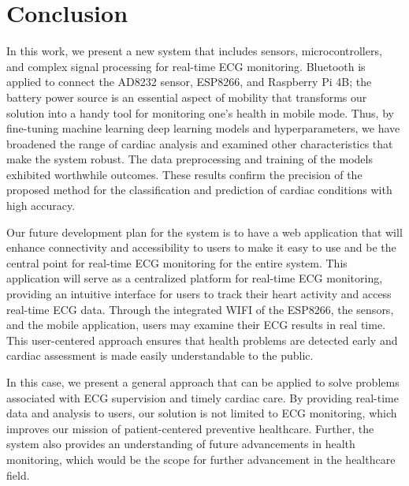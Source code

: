 \documentclass[conference]{IEEEtran}
\begin{document}
\section{Conclusion}

In this work, we present a new system that includes sensors, microcontrollers, and complex signal processing for real-time ECG monitoring. Bluetooth is applied to connect the AD8232 sensor, ESP8266, and Raspberry Pi 4B; the battery power source is an essential aspect of mobility that transforms our solution into a handy tool for monitoring one's health in mobile mode. Thus, by fine-tuning machine learning deep learning models and hyperparameters, we have broadened the range of cardiac analysis and examined other characteristics that make the system robust. The data preprocessing and training of the models exhibited worthwhile outcomes. These results confirm the precision of the proposed method for the classification and prediction of cardiac conditions with high accuracy.

Our future development plan for the system is to have a web application that will enhance connectivity and accessibility to users to make it easy to use and be the central point for real-time ECG monitoring for the entire system. This application will serve as a centralized platform for real-time ECG monitoring, providing an intuitive interface for users to track their heart activity and access real-time ECG data. Through the integrated WIFI of the ESP8266, the sensors, and the mobile application, users may examine their ECG results in real time. This user-centered approach ensures that health problems are detected early and cardiac assessment is made easily understandable to the public.

In this case, we present a general approach that can be applied to solve problems associated with ECG supervision and timely cardiac care. By providing real-time data and analysis to users, our solution is not limited to ECG monitoring, which improves our mission of patient-centered preventive healthcare. Further, the system also provides an understanding of future advancements in health monitoring, which would be the scope for further advancement in the healthcare field.







\end{document}
